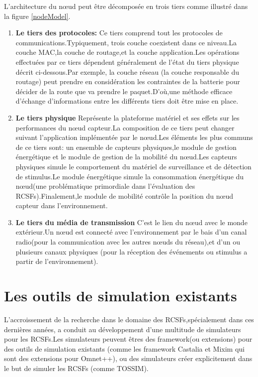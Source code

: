 L'architecture du nœud peut être décomposée en trois tiers comme illustré dans la figure \ref{nodeModel}.
\begin{enumerate}
\item \textbf{Le tiers des protocoles:} 
Ce tiers comprend tout les protocoles de communications.Typiquement,
trois couche coexistent dans ce niveau.La couche MAC,la couche de routage,et la couche application.Les opérations effectuées par ce tiers dépendent généralement de l'état du tiers physique décrit ci-dessous.Par exemple, la couche réseau (la couche responsable du routage) peut prendre en considération les contraintes de la batterie pour décider de la route que va prendre le paquet.D'où,une méthode efficace d'échange d'informations entre les différents tiers doit être mise en place. 
\item\textbf{Le tiers physique}
Représente la plateforme matériel et ses effets sur les performances du nœud capteur.La composition de ce tiers peut changer suivant l'application implémentée par le nœud.Les éléments les plus communs de ce tiers sont: un ensemble de capteurs physiques,le module de gestion énergétique et le module de gestion de la mobilité du nœud.Les capteurs physiques simule le comportement du matériel de surveillance et de détection de stimulus.Le module énergétique simule la consommation énergétique du nœud(une problématique primordiale dans l'évaluation des RCSFs).Finalement,le module de mobilité contrôle la position du nœud capteur dans l'environnement.
\item\textbf{Le tiers du média de transmission}
C'est le lien du nœud avec le monde extérieur.Un nœud est connecté avec l'environnement par le bais d'un canal radio(pour la communication avec les autres nœuds du réseau),et d'un ou plusieurs canaux physiques (pour la réception des événements ou stimulus a partir de l'environnement).
\end{enumerate}


\section{Les outils de simulation existants}

L'accroissement de la recherche dans le domaine des RCSFs,spécialement dans ces dernières années, a conduit au développement d'une multitude de simulateurs pour les RCSFs.Les simulateurs peuvent êtres des framework(ou extensions) pour des outils de simulation existants (comme les framework Castalia et Mixim qui sont des extensions pour Omnet++), ou des simulateurs créer explicitement dans le but de simuler les RCSFs (comme TOSSIM).


